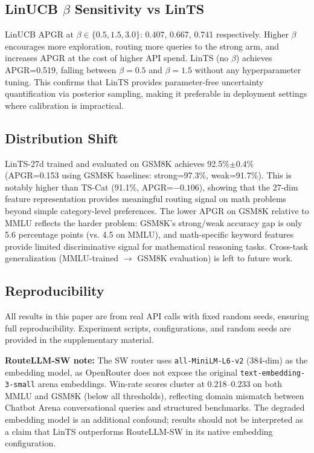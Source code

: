 \subsection{LinUCB $\beta$ Sensitivity vs LinTS}

LinUCB APGR at $\beta \in \{0.5, 1.5, 3.0\}$: 0.407, 0.667, 0.741 respectively.
Higher $\beta$ encourages more exploration, routing more queries to the strong arm, and increases APGR at the cost of higher API spend.
LinTS (no $\beta$) achieves APGR=0.519, falling between $\beta=0.5$ and $\beta=1.5$ without any hyperparameter tuning.
This confirms that LinTS provides parameter-free uncertainty quantification via posterior sampling, making it preferable in deployment settings where calibration is impractical.

\subsection{Distribution Shift}

LinTS-27d trained and evaluated on GSM8K achieves 92.5\%$\pm$0.4\% (APGR=0.153 using GSM8K baselines: strong=97.3\%, weak=91.7\%).
This is notably higher than TS-Cat (91.1\%, APGR=$-0.106$), showing that the 27-dim feature representation provides meaningful routing signal on math problems beyond simple category-level preferences.
The lower APGR on GSM8K relative to MMLU reflects the harder problem: GSM8K's strong/weak accuracy gap is only 5.6 percentage points (vs. 4.5 on MMLU), and math-specific keyword features provide limited discriminative signal for mathematical reasoning tasks.
Cross-task generalization (MMLU-trained $\rightarrow$ GSM8K evaluation) is left to future work.

\subsection{Reproducibility}

All results in this paper are from real API calls with fixed random seeds, ensuring full reproducibility.
Experiment scripts, configurations, and random seeds are provided in the supplementary material.

\textbf{RouteLLM-SW note:} The SW router uses \texttt{all-MiniLM-L6-v2} (384-dim) as the embedding model, as OpenRouter does not expose the original \texttt{text-embedding-3-small} arena embeddings. Win-rate scores cluster at 0.218--0.233 on both MMLU and GSM8K (below all thresholds), reflecting domain mismatch between Chatbot Arena conversational queries and structured benchmarks. The degraded embedding model is an additional confound; results should not be interpreted as a claim that LinTS outperforms RouteLLM-SW in its native embedding configuration.
